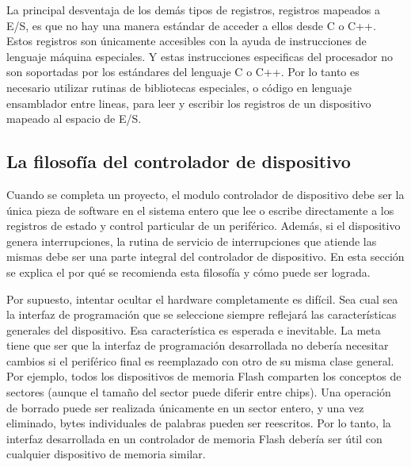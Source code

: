 \documentclass[12pt]{article}
\begin{document}
La principal desventaja de los demás tipos de registros, registros mapeados
a E/S, es que no hay una manera estándar de acceder a ellos desde C o C++. 
Estos registros son únicamente accesibles con la ayuda de instrucciones
de lenguaje máquina especiales. Y estas instrucciones especificas del procesador
no son soportadas por los estándares del lenguaje C o C++. Por lo tanto
es necesario utilizar rutinas de bibliotecas especiales, o código en lenguaje
ensamblador entre lineas, para leer y escribir los registros de un
dispositivo mapeado al espacio de E/S.


\subsection *{La filosofía del controlador de dispositivo}


Cuando se completa un proyecto, el modulo controlador de dispositivo debe 
ser la única
pieza de software en el sistema entero que lee o escribe directamente a los 
registros de estado y control particular de un periférico. Además, si el 
dispositivo 
genera interrupciones, la rutina de servicio de interrupciones que 
atiende las mismas debe ser una parte integral del controlador de dispositivo.
En esta sección se explica el por qué se recomienda esta filosofía y cómo
puede ser lograda.

Por supuesto, intentar ocultar el hardware completamente es difícil. Sea cual
sea la interfaz de programación que se seleccione siempre reflejará las
características generales del dispositivo. Esa característica es esperada
e inevitable. La meta tiene que ser que la interfaz de programación
desarrollada no debería necesitar cambios si el periférico final es reemplazado
con otro de su misma clase general. Por ejemplo, todos los dispositivos de memoria
Flash comparten los conceptos de sectores (aunque el tamaño del sector
puede diferir entre chips). Una operación de borrado puede ser realizada
únicamente en un sector entero, y una vez eliminado, bytes individuales
de palabras pueden ser reescritos. Por lo tanto, la interfaz desarrollada
en un controlador de memoria Flash debería ser útil con cualquier
dispositivo de memoria similar.
\end{document}
